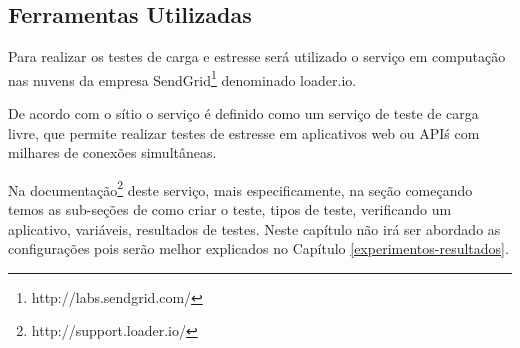 







\subsection{Ferramentas Utilizadas}
\label{ferramentas-utilizadas-para-testes}
  
  Para realizar os testes de carga e estresse será utilizado o serviço em computação nas nuvens
  da empresa SendGrid\footnote{http://labs.sendgrid.com/} denominado loader.io.
  
  De acordo com o sítio o serviço é definido como um serviço de teste de carga livre,
  que permite realizar testes de estresse em aplicativos web ou API\'s com milhares de conexões simultâneas.
  
  Na documentação\footnote{http://support.loader.io/} deste serviço, mais especificamente, na seção começando
  temos as sub-seções de como criar o teste, tipos de teste, verificando um aplicativo, variáveis,
  resultados de testes. Neste capítulo não irá ser abordado as configurações pois serão melhor explicados
  no Capítulo \ref{experimentos-resultados}.